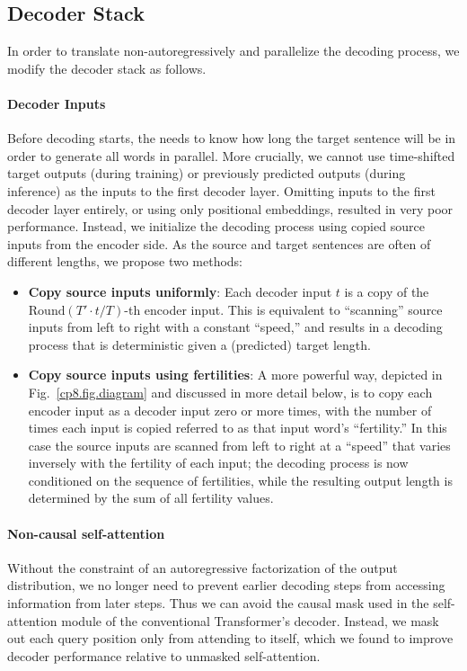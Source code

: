\subsection{Decoder Stack}\label{cp8.sec.decoderStack}
In order to translate non-autoregressively and parallelize the decoding process, we modify the decoder stack as follows.

\paragraph{Decoder Inputs}
Before decoding starts, the \model{} needs to know how long the target sentence will be in order to generate all words in parallel.
More crucially, we cannot use time-shifted target outputs (during training) or previously predicted outputs (during inference) as the inputs to the first decoder layer.
Omitting inputs to the first decoder layer entirely, or using only positional embeddings, resulted in very poor performance.
Instead, we initialize the decoding process using copied source inputs from the encoder side. As the source and target sentences are often of different lengths, we propose two methods:
\begin{itemize}
\item \textbf{Copy source inputs uniformly}: Each decoder input $t$ is a copy of the $\textrm{Round}(T'\cdot t/T)$-th encoder input. This is equivalent to ``scanning'' source inputs from left to right with a constant ``speed,'' and results in a decoding process that is deterministic given a (predicted) target length.
\item \textbf{Copy source inputs using fertilities}: A more powerful way, depicted in Fig.~\ref{cp8.fig.diagram} and discussed in more detail below, 
is to copy each encoder input as a decoder input zero or more times, with the number of times each input is copied referred to as that input word's ``fertility.''
In this case the source inputs are scanned from left to right at a ``speed'' that varies inversely with the fertility of each input; the decoding process is now conditioned on the sequence of fertilities, while the resulting output length is determined by the sum of all fertility values. 
\end{itemize}


\paragraph{Non-causal self-attention}
Without the constraint of an autoregressive factorization of the output distribution, we no longer need to prevent earlier decoding steps from accessing information from later steps. Thus we can avoid the causal mask used in the self-attention module of the conventional Transformer's decoder. Instead, we  mask out each query position only from attending to itself, which we found to improve decoder performance relative to unmasked self-attention.


